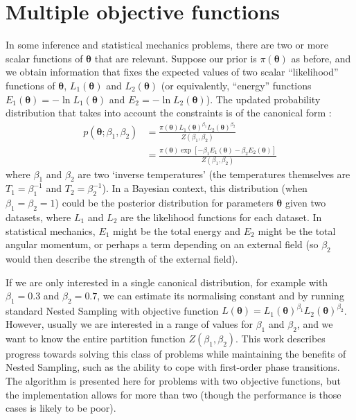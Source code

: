 \documentclass[entropy,article,submit,moreauthors,pdftex,10pt,a4paper]{Definitions/mdpi}
\newcommand{\xx}{\boldsymbol{\theta}}
\begin{document}
\section{Multiple objective functions}
In some inference and
statistical mechanics problems, there are two or more scalar functions of
$\xx$ that are relevant. Suppose our prior is $\pi(\xx)$ as before, and
we obtain information that fixes the expected values of two scalar
``likelihood'' functions of $\xx$, $L_1(\xx)$ and $L_2(\xx)$
(or equivalently, ``energy'' functions $E_1(\xx) = -\ln L_1(\xx)$ and
$E_2 = -\ln L_2(\xx)$). The
updated probability distribution that takes into account the constraints is
of the canonical form \citep{jaynes1957information}:
\begin{align}
p(\xx; \beta_1, \beta_2) &=
    \frac{\pi(\xx)L_1(\xx)^{\beta_1}L_2(\xx)^{\beta_2}}
         {Z(\beta_1, \beta_2)} \\
    &=
    \frac{\pi(\xx)\exp\left[-\beta_1E_1(\xx) - \beta_2E_2(\xx)\right]}
         {Z(\beta_1, \beta_2)}
\end{align}
where $\beta_1$ and $\beta_2$ are two `inverse temperatures' (the temperatures
themselves are $T_1 = \beta_1^{-1}$ and $T_2 = \beta_2^{-1}$).
In a Bayesian
context, this distribution (when $\beta_1 = \beta_2 = 1$) could be the
posterior distribution for parameters $\xx$
given two datasets, where $L_1$ and $L_2$ are the
likelihood functions for each dataset. In statistical mechanics, $E_1$ might
be the total energy and $E_2$ might be the total
angular momentum, or perhaps a term depending on an external field (so $\beta_2$
would then describe the strength of the external field).

If we are only interested in a single canonical distribution, for example
with $\beta_1 = 0.3$ and $\beta_2 = 0.7$, we can estimate its normalising
constant and by running standard Nested Sampling with objective function
$L(\xx) = L_1(\xx)^{\beta_1}L_2(\xx)^{\beta_2}$. However, usually we
are interested in a range of values for $\beta_1$ and $\beta_2$, and we
want to know the entire partition function $Z(\beta_1, \beta_2)$.
This work describes
progress towards solving this class of problems while maintaining the benefits
of Nested Sampling, such as the ability to cope with first-order phase
transitions. The algorithm is presented here for problems with two objective
functions, but the implementation allows for more than two (though the
performance is those cases is likely to be poor).


\
\end{document}
